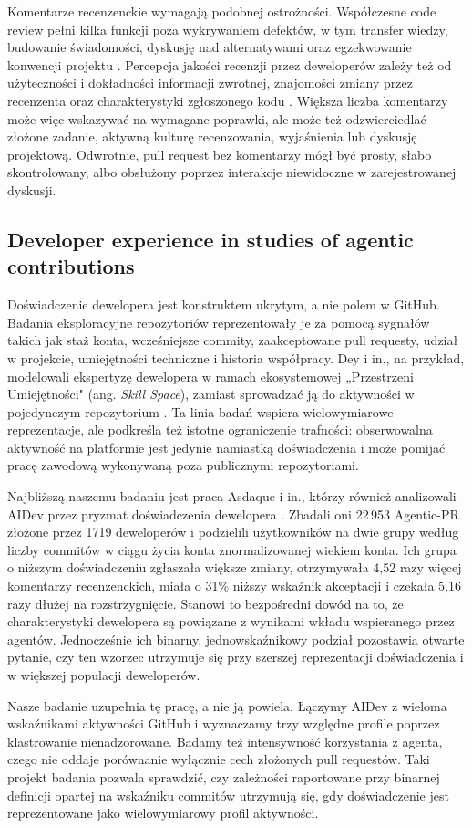 Komentarze recenzenckie wymagają podobnej ostrożności. Współczesne code review pełni kilka funkcji poza wykrywaniem defektów, w tym transfer wiedzy, budowanie świadomości, dyskusję nad alternatywami oraz egzekwowanie konwencji projektu \cite{bacchelli2013expectations}. Percepcja jakości recenzji przez deweloperów zależy też od użyteczności i dokładności informacji zwrotnej, znajomości zmiany przez recenzenta oraz charakterystyki zgłoszonego kodu \cite{kononenko2016quality}. Większa liczba komentarzy może więc wskazywać na wymagane poprawki, ale może też odzwierciedlać złożone zadanie, aktywną kulturę recenzowania, wyjaśnienia lub dyskusję projektową. Odwrotnie, pull request bez komentarzy mógł być prosty, słabo skontrolowany, albo obsłużony poprzez interakcje niewidoczne w zarejestrowanej dyskusji.

\subsection{Developer experience in studies of agentic contributions}

Doświadczenie dewelopera jest konstruktem ukrytym, a nie polem w GitHub. Badania eksploracyjne repozytoriów reprezentowały je za pomocą sygnałów takich jak staż konta, wcześniejsze commity, zaakceptowane pull requesty, udział w projekcie, umiejętności techniczne i historia współpracy. Dey i in., na przykład, modelowali ekspertyzę dewelopera w ramach ekosystemowej „Przestrzeni Umiejętności" (ang. \emph{Skill Space}), zamiast sprowadzać ją do aktywności w pojedynczym repozytorium \cite{dey2021expertise}. Ta linia badań wspiera wielowymiarowe reprezentacje, ale podkreśla też istotne ograniczenie trafności: obserwowalna aktywność na platformie jest jedynie namiastką doświadczenia i może pomijać pracę zawodową wykonywaną poza publicznymi repozytoriami.

Najbliższą naszemu badaniu jest praca Asdaque i in., którzy również analizowali AIDev przez pryzmat doświadczenia dewelopera \cite{asdaque2026novice}. Zbadali oni 22\,953 Agentic-PR złożone przez 1719 deweloperów i podzielili użytkowników na dwie grupy według liczby commitów w ciągu życia konta znormalizowanej wiekiem konta. Ich grupa o niższym doświadczeniu zgłaszała większe zmiany, otrzymywała 4,52 razy więcej komentarzy recenzenckich, miała o 31\% niższy wskaźnik akceptacji i czekała 5,16 razy dłużej na rozstrzygnięcie. Stanowi to bezpośredni dowód na to, że charakterystyki dewelopera są powiązane z wynikami wkładu wspieranego przez agentów. Jednocześnie ich binarny, jednowskaźnikowy podział pozostawia otwarte pytanie, czy ten wzorzec utrzymuje się przy szerszej reprezentacji doświadczenia i w większej populacji deweloperów.

Nasze badanie uzupełnia tę pracę, a nie ją powiela. Łączymy AIDev z wieloma wskaźnikami aktywności GitHub i wyznaczamy trzy względne profile poprzez klastrowanie nienadzorowane. Badamy też intensywność korzystania z agenta, czego nie oddaje porównanie wyłącznie cech złożonych pull requestów. Taki projekt badania pozwala sprawdzić, czy zależności raportowane przy binarnej definicji opartej na wskaźniku commitów utrzymują się, gdy doświadczenie jest reprezentowane jako wielowymiarowy profil aktywności.
